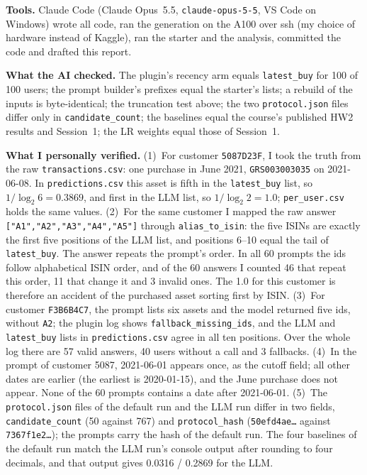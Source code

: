 \documentclass[conference]{IEEEtran}
\begin{document}
\textbf{Tools.} Claude Code (Claude Opus~5.5, \texttt{claude-opus-5-5}, VS Code on Windows) wrote all code, ran the generation on the A100 over ssh (my choice of hardware instead of Kaggle), ran the starter and the analysis, committed the code and drafted this report.

\textbf{What the AI checked.} The plugin's recency arm equals \texttt{latest\_buy} for 100 of 100 users; the prompt builder's prefixes equal the starter's lists; a rebuild of the inputs is byte-identical; the truncation test above; the two \texttt{protocol.json} files differ only in \texttt{candidate\_count}; the baselines equal the course's published HW2 results and Session~1; the LR weights equal those of Session~1.

\textbf{What I personally verified.} (1)~For customer \texttt{5087D23F}, I took the truth from the raw \texttt{transactions.csv}: one purchase in June 2021, \texttt{GRS003003035} on 2021-06-08. In \texttt{predictions.csv} this asset is fifth in the \texttt{latest\_buy} list, so $1/\log_2 6 = 0.3869$, and first in the LLM list, so $1/\log_2 2 = 1.0$; \texttt{per\_user.csv} holds the same values. (2)~For the same customer I mapped the raw answer \texttt{["A1","A2","A3","A4","A5"]} through \texttt{alias\_to\_isin}: the five ISINs are exactly the first five positions of the LLM list, and positions 6--10 equal the tail of \texttt{latest\_buy}. The answer repeats the prompt's order. In all 60 prompts the ids follow alphabetical ISIN order, and of the 60 answers I counted 46 that repeat this order, 11 that change it and 3 invalid ones. The 1.0 for this customer is therefore an accident of the purchased asset sorting first by ISIN. (3)~For customer \texttt{F3B6B4C7}, the prompt lists six assets and the model returned five ids, without \texttt{A2}; the plugin log shows \texttt{fallback\_missing\_ids}, and the LLM and \texttt{latest\_buy} lists in \texttt{predictions.csv} agree in all ten positions. Over the whole log there are 57 valid answers, 40 users without a call and 3 fallbacks. (4)~In the prompt of customer 5087, 2021-06-01 appears once, as the cutoff field; all other dates are earlier (the earliest is 2020-01-15), and the June purchase does not appear. None of the 60 prompts contains a date after 2021-06-01. (5)~The \texttt{protocol.json} files of the default run and the LLM run differ in two fields, \texttt{candidate\_count} (50 against 767) and \texttt{protocol\_hash} (\texttt{50efd4ae\ldots} against \texttt{7367f1e2\ldots}); the prompts carry the hash of the default run. The four baselines of the default run match the LLM run's console output after rounding to four decimals, and that output gives 0.0316 / 0.2869 for the LLM.
\end{document}
